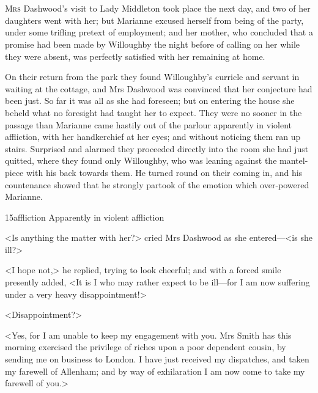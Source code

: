 \chapter[Chapter \thechapter]{}
\lettrine[lraise=0.3]{M}{rs} Dashwood's visit to Lady Middleton took place the next day, and two of her daughters went with her; but Marianne excused herself from being of the party, under some trifling pretext of employment; and her mother, who concluded that a promise had been made by Willoughby the night before of calling on her while they were absent, was perfectly satisfied with her remaining at home.

On their return from the park they found Willoughby's curricle and servant in waiting at the cottage, and Mrs Dashwood was convinced that her conjecture had been just. So far it was all as she had foreseen; but on entering the house she beheld what no foresight had taught her to expect. They were no sooner in the passage than Marianne came hastily out of the parlour apparently in violent affliction, with her handkerchief at her eyes; and without noticing them ran up stairs. Surprised and alarmed they proceeded directly into the room she had just quitted, where they found only Willoughby, who was leaning against the mantel-piece with his back towards them. He turned round on their coming in, and his countenance showed that he strongly partook of the emotion which over-powered Marianne.


\begin{bwbigpic}
	[1.0]
	{15affliction} 
	{Apparently in violent affliction} 
\end{bwbigpic}

<Is anything the matter with her?> cried Mrs Dashwood as she entered—<is she ill?>

<I hope not,> he replied, trying to look cheerful; and with a forced smile presently added, <It is I who may rather expect to be ill—for I am now suffering under a very heavy disappointment!>

<Disappointment?>

<Yes, for I am unable to keep my engagement with you. Mrs Smith has this morning exercised the privilege of riches upon a poor dependent cousin, by sending me on business to London. I have just received my dispatches, and taken my farewell of Allenham; and by way of exhilaration I am now come to take my farewell of you.>

